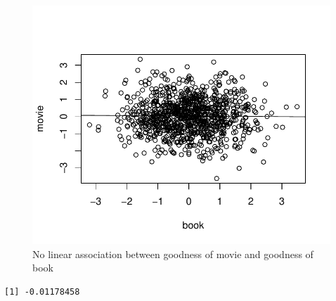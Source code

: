 \begin{knitrout}
\color{fgcolor}\begin{kframe}
\begin{alltt}
\hlstd{(}\hlstd{)}
  \hlkwb{<-} 
  \hlkwb{<-} 
 \hlkwb{<-} 
 
\hlstd{(}\hlopt{~}
\end{alltt}
\end{kframe}\begin{figure}

{\centering \includegraphics[width=\maxwidth]{figure/datacollect-Berkson-1} 

}

\caption[No linear association between goodness of movie and goodness of book]{No linear association between goodness of movie and goodness of book}\label{fig:datacollect-Berkson}
\end{figure}

\begin{kframe}\begin{alltt}
\end{alltt}
\begin{verbatim}
[1] -0.01178458
\end{verbatim}
\end{kframe}
\end{knitrout}

